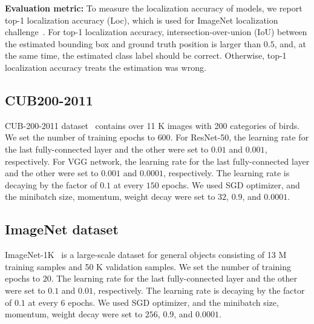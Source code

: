 \noindent\textbf{Evaluation metric: }
To measure the localization accuracy of models, we report top-1 localization accuracy (Loc), which is used for ImageNet localization challenge~\cite{ImageNet}. 
For top-1 localization accuracy, intersection-over-union (IoU) between the estimated bounding box and ground truth position is larger than $0.5$, and, at the same time, the estimated class label should be correct.
Otherwise, top-1 localization accuracy treats the estimation was wrong.


\subsection{CUB200-2011}
CUB-200-2011 dataset~\cite{wah2011cub} contains over 11 K images with 200 categories of birds.
We set the number of training epochs to $600$. 
For ResNet-50, the learning rate for the last fully-connected layer and the other were set to $0.01$ and $0.001$, respectively.
For VGG network, the learning rate for the last fully-connected layer and the other were set to $0.001$ and $0.0001$, respectively.
The learning rate is decaying by the factor of $0.1$ at every $150$ epochs.
We used SGD optimizer, and the minibatch size, momentum, weight decay were set to $32$, $0.9$, and $0.0001$. 

\subsection{ImageNet dataset}
ImageNet-1K~\cite{ImageNet} is a large-scale dataset for general objects consisting of 13 M training samples and 50 K validation samples.
We set the number of training epochs to $20$. 
The learning rate for the last fully-connected layer and the other were set to $0.1$ and $0.01$, respectively.
The learning rate is decaying by the factor of $0.1$ at every $6$ epochs.
We used SGD optimizer, and the minibatch size, momentum, weight decay were set to $256$, $0.9$, and $0.0001$.


